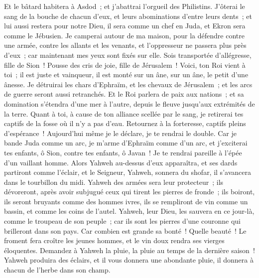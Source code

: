 \begin{multicols}{2}
Et le bâtard habitera à Asdod~; et j'abattrai l'orgueil des Philistins.
J'ôterai le sang de la bouche de chacun d'eux, et leurs abominations d'entre leurs dents~; et lui aussi restera pour notre Dieu, il sera comme un chef en Juda, et Ekron sera comme le Jébusien.
Je camperai autour de ma maison, pour la défendre contre une armée, contre les allants et les venants, et l'oppresseur ne passera plus près d'eux~; car maintenant mes yeux sont fixés sur elle.
Sois transportée d'allégresse, fille de Sion~! Pousse des cris de joie, fille de Jérusalem~! Voici, ton Roi vient à toi~; il est juste et vainqueur, il est monté sur un âne, sur un âne, le petit d'une ânesse.
Je détruirai les chars d'Ephraïm, et les chevaux de Jérusalem~; et les arcs de guerre seront aussi retranchés. Et le Roi parlera de paix aux nations~; et sa domination s'étendra d'une mer à l'autre, depuis le fleuve jusqu'aux extrémités de la terre.
Quant à toi, à cause de ton alliance scellée par le sang, je retirerai tes captifs de la fosse où il n'y a pas d'eau.
Retournez à la forteresse, captifs pleins d'espérance~! Aujourd'hui même je le déclare, je te rendrai le double.
Car je bande Juda comme un arc, je m'arme d'Ephraïm comme d'un arc, et j'exciterai tes enfants, ô Sion, contre tes enfants, ô Javan~! Je te rendrai pareille à l'épée d'un vaillant homme.
Alors Yahweh au-dessus d'eux apparaîtra, et ses dards partiront comme l'éclair, et le Seigneur, Yahweh, sonnera du shofar, il s'avancera dans le tourbillon du midi.
Yahweh des armées sera leur protecteur~; ils dévoreront, après avoir subjugué ceux qui tirent les pierres de fronde~; ils boiront, ils seront bruyants comme des hommes ivres, ils se rempliront de vin comme un bassin, et comme les coins de l'autel.
Yahweh, leur Dieu, les sauvera en ce jour-là, comme le troupeau de son peuple~; car ils sont les pierres d'une couronne qui brilleront dans son pays.
Car combien est grande sa bonté~! Quelle beauté~! Le froment fera croître les jeunes hommes, et le vin doux rendra ses vierges éloquentes.
\VerseOne{}Demandez à Yahweh la pluie, la pluie au temps de la dernière saison~! Yahweh produira des éclairs, et il vous donnera une abondante pluie, il donnera à chacun de l'herbe dans son champ.

\end{multicols}
